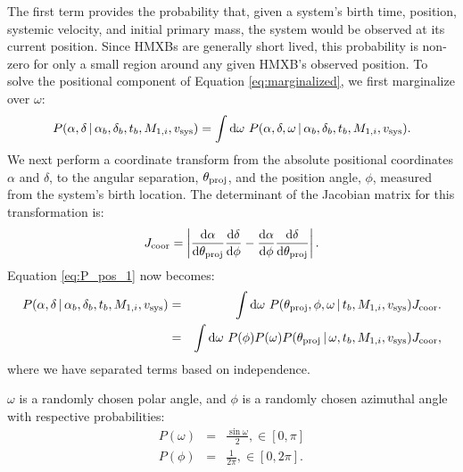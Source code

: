 \documentclass[12pt, preprint]{aastex}
\newcommand{\given}{\,|\,}
\newcommand{\dd}{\mathrm{d}}
\begin{document}
The first term provides the probability that, given a system's birth time, position, systemic velocity, and initial primary mass, the system would be observed at its current position. Since HMXBs are generally short lived, this probability is non-zero for only a small region around any given HMXB's observed position. To solve the positional component of Equation \ref{eq:marginalized}, we first marginalize over $\omega$:
\begin{equation}
P(\alpha, \delta \given \alpha_b, \delta_b, t_b, M_{1,i}, v_{\rm sys} ) = \int \dd \omega\ P(\alpha, \delta, \omega \given \alpha_b, \delta_b, t_b, M_{1,i}, v_{\rm sys} ). \label{eq:P_pos_1}
\end{equation}
We next perform a coordinate transform from the absolute positional coordinates $\alpha$ and $\delta$, to the angular separation, $\theta_{\rm proj}$, and the position angle, $\phi$, measured from the system's birth location. The determinant of the Jacobian matrix for this transformation is:
\begin{equation}
J_{\rm coor} = \left| \frac{\dd \alpha}{\dd \theta_{\rm proj}} \frac{\dd \delta}{\dd \phi} - \frac{\dd \alpha}{\dd \phi} \frac{\dd \delta}{\dd \theta_{\rm proj}} \right|.
\end{equation}
Equation \ref{eq:P_pos_1} now becomes:
\begin{eqnarray}
P(\alpha, \delta \given \alpha_b, \delta_b, t_b, M_{1,i}, v_{\rm sys} ) &=& \int \dd \omega\ P(\theta_{\rm proj}, \phi, \omega \given t_b, M_{1,i}, v_{\rm sys} ) J_{\rm coor}. \nonumber \\
&=& \int \dd \omega\ P(\phi) P(\omega) P(\theta_{\rm proj} \given \omega,  t_b, M_{1,i}, v_{\rm sys} ) J_{\rm coor}, \label{eq:P_pos_2}
\end{eqnarray}
where we have separated terms based on independence.

$\omega$ is a randomly chosen polar angle, and $\phi$ is a randomly chosen azimuthal angle with respective probabilities: 
\begin{eqnarray}
P(\omega) &=& \frac{\sin \omega} {2}, \in [0,\pi] \\
P(\phi) &=& \frac{1}{2 \pi}, \in [0, 2\pi].
\end{eqnarray}
\end{document}
